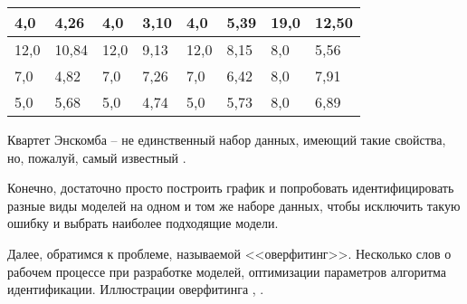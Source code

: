 \begin{table}[!htp]
\begin{tabular}{|ll|ll|ll|ll|}
			\multicolumn{1}{|l|}{4,0}  & 4,26                   & \multicolumn{1}{l|}{4,0}  & 3,10                   & \multicolumn{1}{l|}{4,0}  & 5,39                   & \multicolumn{1}{l|}{19,0} & 12,50                  \\ \hline
			\multicolumn{1}{|l|}{12,0} & 10,84                  & \multicolumn{1}{l|}{12,0} & 9,13                   & \multicolumn{1}{l|}{12,0} & 8,15                   & \multicolumn{1}{l|}{8,0}  & 5,56                   \\ \hline
			\multicolumn{1}{|l|}{7,0}  & 4,82                   & \multicolumn{1}{l|}{7,0}  & 7,26                   & \multicolumn{1}{l|}{7,0}  & 6,42                   & \multicolumn{1}{l|}{8,0}  & 7,91                   \\ \hline
			\multicolumn{1}{|l|}{5,0}  & 5,68                   & \multicolumn{1}{l|}{5,0}  & 4,74                   & \multicolumn{1}{l|}{5,0}  & 5,73                   & \multicolumn{1}{l|}{8,0}  & 6,89                   \\ \hline
		\end{tabular}
		\label{table:anscombe_quartet}
	\end{table}

	Квартет Энскомба -- не единственный набор данных, имеющий такие свойства, 
	но, пожалуй, самый известный \cite{anscombe_quartet_wikipedia}. 

	Конечно, достаточно просто построить график и попробовать идентифицировать
	разные виды моделей на одном и том же наборе данных, чтобы исключить такую
	ошибку и выбрать наиболее подходящие модели.

	
	Далее, обратимся к проблеме, называемой <<оверфитинг>>.
    Несколько слов о рабочем процессе при разработке моделей, оптимизации 
    параметров алгоритма идентификации.	Иллюстрации оверфитинга 
    \cite{hands_on_ml}, \cite{sklearn_cross_validation}.